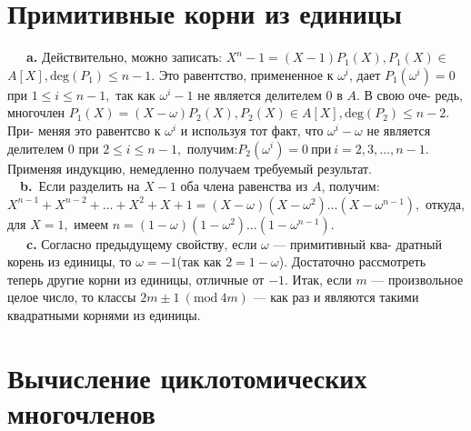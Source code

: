 \documentclass{mai_book}
\begin{document}
\section{Примитивные корни из единицы}

\indent ~~~\textbf{a.} Действительно, можно записать: $X^n-1=(X-1)P_1(X),P_1(X)\in$ \linebreak
$A[X], \text{deg}(P_1)\leq n-1.$ Это равентство, примененное к $\omega^i$, дает $P_1(\omega^i)=0 $\linebreak
при $1\leq i \leq n-1, $ так как $\omega^i-1$ не является делителем $0$ в $A$. В свою оче-\linebreak
редь, многочлен $P_1(X)=(X-\omega)P_2(X),P_2(X)\in A[X], \text{deg}(P_2)\leq n-2.$ При- \linebreak
меняя это равентсво к $\omega^i$ и используя тот факт, что $\omega^i-\omega$ не является \linebreak
делителем 0 при $2\leq i \leq n-1,$ получим:$P_2(\omega^i)=0~\text{при}~i=2,3,\ldots,n-1. $\linebreak
Применяя индукцию, немедленно получаем требуемый результат. \\
\indent
~~\textbf{b.}~Если разделить на $X-1$ оба члена равенства из $A$, получим: \\
$X^{n-1}+X^{n-2}+\ldots+X^2+X+1=(X-\omega)(X-\omega^2)\ldots(X-\omega^{n-1}),$\linebreak
откуда, для $X=1,$ имеем $n=(1-\omega)(1-\omega^2)\ldots(1-\omega^{n-1}). $\\

\newpage
\indent
~~~\textbf{c.} Согласно предыдущему свойству, если $\omega$ --- примитивный ква-\linebreak
дратный корень из единицы, то $\omega=-1$(так как $2=1-\omega$). Достаточно\linebreak
рассмотреть теперь другие корни из единицы, отличные от $-1.$ Итак, \linebreak
если $m$ --- произвольное целое число, то классы $2m\pm 1~(\text{mod}~4m)$ --- как\linebreak
раз и являются такими квадратными корнями из единицы.
\setcounter{thesection}{10}
\section{Вычисление циклотомических многочленов}
\end{document}
